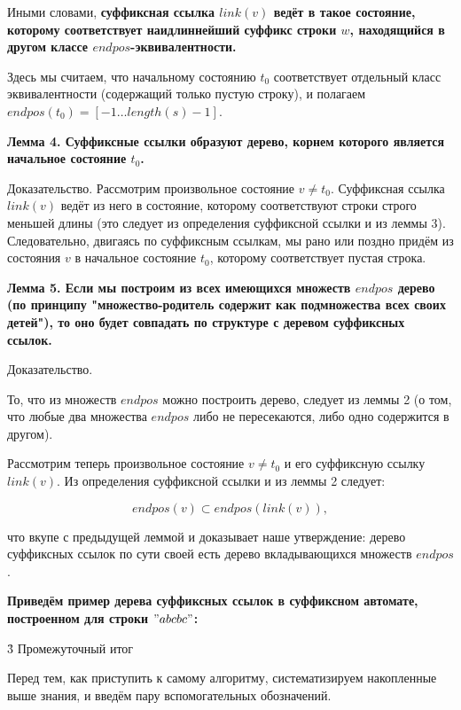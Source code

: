 Иными словами, \bf{суффиксная ссылка} $link(v)$ ведёт в такое состояние, которому соответствует \bf{наидлиннейший суффикс} строки $w$, находящийся в другом классе $endpos$-эквивалентности.

Здесь мы считаем, что начальному состоянию $t_0$ соответствует отдельный класс эквивалентности (содержащий только пустую строку), и полагаем $endpos(t_0) = [-1 \ldots length(s)-1]$.

\bf{Лемма 4}. Суффиксные ссылки образуют \bf{дерево}, корнем которого является начальное состояние $t_0$.

Доказательство. Рассмотрим произвольное состояние $v \ne t_0$. Суффиксная ссылка $link(v)$ ведёт из него в состояние, которому соответствуют строки строго меньшей длины (это следует из определения суффиксной ссылки и из леммы 3). Следовательно, двигаясь по суффиксным ссылкам, мы рано или поздно придём из состояния $v$ в начальное состояние $t_0$, которому соответствует пустая строка.

\bf{Лемма 5}. Если мы построим из всех имеющихся множеств $endpos$ \bf{дерево} (по принципу "множество-родитель содержит как подмножества всех своих детей"), то оно будет совпадать по структуре с деревом суффиксных ссылок.

Доказательство.

То, что из множеств $endpos$ можно построить дерево, следует из леммы 2 (о том, что любые два множества $endpos$ либо не пересекаются, либо одно содержится в другом).

Рассмотрим теперь произвольное состояние $v \ne t_0$ и его суффиксную ссылку $link(v)$. Из определения суффиксной ссылки и из леммы 2 следует:

$$ endpos(v) \subset endpos(link(v)), $$

что вкупе с предыдущей леммой и доказывает наше утверждение: дерево суффиксных ссылок по сути своей есть дерево вкладывающихся множеств $endpos$.

\bf{Приведём пример} дерева суффиксных ссылок в суффиксном автомате, построенном для строки $"abcbc"$:



\h3{ Промежуточный итог }

Перед тем, как приступить к самому алгоритму, систематизируем накопленные выше знания, и введём пару вспомогательных обозначений.


